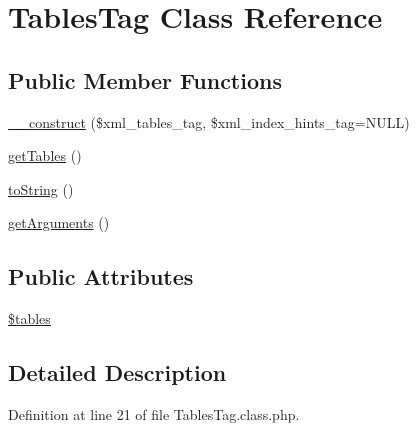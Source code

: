 \hypertarget{classTablesTag}{\section{Tables\-Tag Class Reference}
\label{classTablesTag}
}
\subsection*{Public Member Functions}
\begin{DoxyCompactItemize}
\item 
\hyperlink{classTablesTag_a4b3f70affd20ad1e5ce1c82a87af2355}{\-\_\-\-\_\-construct} (\$xml\-\_\-tables\-\_\-tag, \$xml\-\_\-index\-\_\-hints\-\_\-tag=N\-U\-L\-L)
\item 
\hyperlink{classTablesTag_a7df694e7322df714e37c2c150c472bf5}{get\-Tables} ()
\item 
\hyperlink{classTablesTag_a01ef1da6c0c67a0b89a5174d44272ff9}{to\-String} ()
\item 
\hyperlink{classTablesTag_a6398e51952c21a5e713499d61114492a}{get\-Arguments} ()
\end{DoxyCompactItemize}
\subsection*{Public Attributes}
\begin{DoxyCompactItemize}
\item 
\hyperlink{classTablesTag_ad37e049d751434627d0ae2e1eb9d431a}{\$tables}
\end{DoxyCompactItemize}


\subsection{Detailed Description}


Definition at line 21 of file Tables\-Tag.\-class.\-php.



